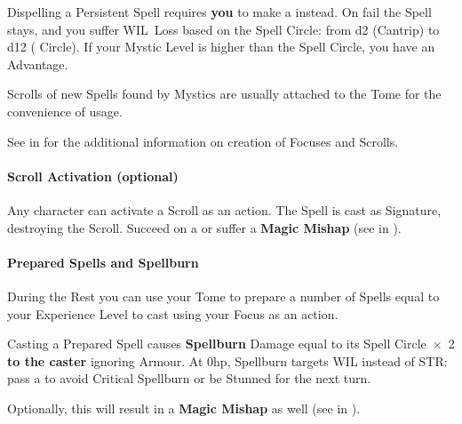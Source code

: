 \documentclass[itdr]{subfiles}
\begin{document}
Dispelling a Persistent Spell requires \textbf{you} to make a  instead. On fail the Spell stays, and you suffer WIL~Loss based on the Spell Circle: from d2 (Cantrip) to d12 ( Circle). If your Mystic Level is higher than the Spell Circle, you have an Advantage.

\vfill
\begin{dbox}
	Scrolls of new Spells found by Mystics are usually attached to the Tome for the convenience of usage.

	See \textbf{} in \mbox{\textbf{}} for the additional information on creation of Focuses and Scrolls.
\end{dbox}

\vfill
{}
\begin{dbox}
	\paragraph{Scroll Activation (optional)}
	Any character can activate a Scroll as an action. The Spell is cast as Signature, destroying the Scroll. Succeed on a  or suffer a \textbf{Magic Mishap} (see \textbf{} in \textbf{}).
\end{dbox}

\vfill

\paragraph{Prepared Spells and Spellburn}
During the Rest you can use your Tome to prepare a number of Spells equal to your Experience Level to cast using your Focus as an action.

Casting a Prepared Spell causes \textbf{Spellburn} \mbox{Damage} equal to its Spell Circle~$\times$~2 \textbf{to the caster} ignoring Armour. At 0hp, Spellburn targets WIL \mbox{instead} of STR: pass a  to avoid Critical Spellburn or be Stunned for the next turn.

\begin{dbox}
	Optionally, this will result in a \textbf{Magic Mishap} as well (see \textbf{} in \textbf{}).
\end{dbox}
\end{document}
